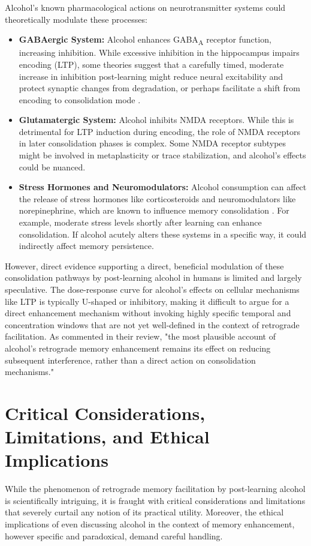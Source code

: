 \documentclass[12pt, a4paper]{article}
\begin{document}
Alcohol's known pharmacological actions on neurotransmitter systems could theoretically modulate these processes:
\begin{itemize}
    \item \textbf{GABAergic System:} Alcohol enhances GABA\textsubscript{A} receptor function, increasing inhibition. While excessive inhibition in the hippocampus impairs encoding (LTP), some theories suggest that a carefully timed, moderate increase in inhibition post-learning might reduce neural excitability and protect synaptic changes from degradation, or perhaps facilitate a shift from encoding to consolidation mode \cite{Hasselmo2002}.
    \item \textbf{Glutamatergic System:} Alcohol inhibits NMDA receptors. While this is detrimental for LTP induction during encoding, the role of NMDA receptors in later consolidation phases is complex. Some NMDA receptor subtypes might be involved in metaplasticity or trace stabilization, and alcohol's effects could be nuanced.
    \item \textbf{Stress Hormones and Neuromodulators:} Alcohol consumption can affect the release of stress hormones like corticosteroids and neuromodulators like norepinephrine, which are known to influence memory consolidation \cite{Roozendaal2009}. For example, moderate stress levels shortly after learning can enhance consolidation. If alcohol acutely alters these systems in a specific way, it could indirectly affect memory persistence.
\end{itemize}
However, direct evidence supporting a direct, beneficial modulation of these consolidation pathways by post-learning alcohol in humans is limited and largely speculative. The dose-response curve for alcohol's effects on cellular mechanisms like LTP is typically U-shaped or inhibitory, making it difficult to argue for a direct enhancement mechanism without invoking highly specific temporal and concentration windows that are not yet well-defined in the context of retrograde facilitation. As \cite{Stephens2008} commented in their review, "the most plausible account of alcohol's retrograde memory enhancement remains its effect on reducing subsequent interference, rather than a direct action on consolidation mechanisms."

\section{Critical Considerations, Limitations, and Ethical Implications}
While the phenomenon of retrograde memory facilitation by post-learning alcohol is scientifically intriguing, it is fraught with critical considerations and limitations that severely curtail any notion of its practical utility. Moreover, the ethical implications of even discussing alcohol in the context of memory enhancement, however specific and paradoxical, demand careful handling.
\end{document}
